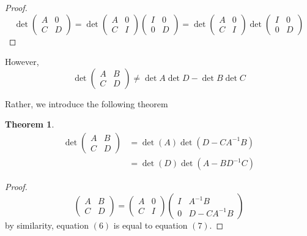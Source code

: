 \documentclass{article}
\newtheorem{theorem}{Theorem}[section]
\theoremstyle{remark}
\theoremstyle{definition}
\begin{document}
    \begin{proof}
    \[ \det{\begin{pmatrix}
    A&0\\C&D 
    \end{pmatrix}} = \det{\begin{pmatrix}
    A&0\\C&I
    \end{pmatrix} \begin{pmatrix}
    I&0\\0&D
    \end{pmatrix}} = \det{\begin{pmatrix}
    A&0\\C&I
    \end{pmatrix}} \det{\begin{pmatrix}
    I&0\\0&D
    \end{pmatrix}}\]
    \end{proof}

    However, 
    \[\det{\begin{pmatrix}
    A&B\\C&D
    \end{pmatrix}} \neq \det{A} \det{D} - \det{B} \det{C}\]

    Rather, we introduce the following theorem

    \begin{theorem}
    \begin{align}
        \det{\begin{pmatrix} A&B\\C&D \end{pmatrix}}  & = \det{(A)} \det{(D - C A^{-1} B)} \\
        & = \det{(D)} \det{(A - B D^{-1} C)}
    \end{align}
    \end{theorem}
    \begin{proof}
    \[\begin{pmatrix} A&B\\C&D\end{pmatrix} = \begin{pmatrix}
    A&0\\C&I\end{pmatrix} \begin{pmatrix}
    I& A^{-1} B \\ 0 & D - C A^{-1} B
    \end{pmatrix}\]
    by similarity, equation $(6)$ is equal to equation $(7)$. 
    \end{proof}
\end{document}
